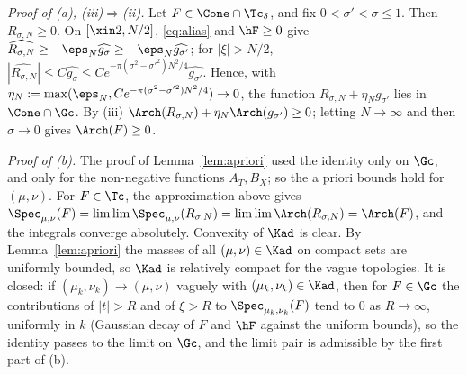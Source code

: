 \emph{Proof of \textup{(a)}, \textup{(iii)}$\Rightarrow$\textup{(ii)}.} Let $F\in\Cone\cap\Tc_\delta$, and fix $0<\sigma'<\sigma\le1$. Then
$R_{\sigma,N}\ge0$. On $[\xin2,N/2]$, \eqref{eq:alias} and $\hF\ge0$ give $\widehat{R_{\sigma,N}}\ge-\eps_N\widehat{g_\sigma}\ge-\eps_N\widehat{g_{\sigma'}}$; for
$|\xi|>N/2$, $|\widehat{R_{\sigma,N}}|\le C\widehat{g_\sigma}\le Ce^{-\pi(\sigma^2-\sigma'^2)N^2/4}\widehat{g_{\sigma'}}$. Hence, with
$\eta_N:=\max(\eps_N,Ce^{-\pi(\sigma^2-\sigma'^2)N^2/4})\to0$, the function $R_{\sigma,N}+\eta_Ng_{\sigma'}$ lies in $\Cone\cap\Gc$. By (iii)
$\Arch(R_{\sigma,N})+\eta_N\Arch(g_{\sigma'})\ge0$; letting $N\to\infty$ and then $\sigma\to0$ gives $\Arch(F)\ge0$.

\emph{Proof of \textup{(b)}.} The proof of Lemma~\ref{lem:apriori} used the identity only on $\Gc$, and only for the non-negative
functions $A_T,B_X$; so the a priori bounds hold for $(\mu,\nu)$. For $F\in\Tc$, the approximation above gives
$\Spec_{\mu,\nu}(F)=\lim\lim\Spec_{\mu,\nu}(R_{\sigma,N})=\lim\lim\Arch(R_{\sigma,N})=\Arch(F)$, and the integrals converge absolutely. Convexity of
$\Kad$ is clear. By Lemma~\ref{lem:apriori} the masses of all $(\mu,\nu)\in\Kad$ on compact sets are uniformly bounded, so $\Kad$ is relatively
compact for the vague topologies. It is closed: if $(\mu_k,\nu_k)\to(\mu,\nu)$ vaguely with $(\mu_k,\nu_k)\in\Kad$, then for $F\in\Gc$ the
contributions of $|t|>R$ and of $\xi>R$ to $\Spec_{\mu_k,\nu_k}(F)$ tend to $0$ as $R\to\infty$, uniformly in $k$ (Gaussian decay of $F$ and
$\hF$ against the uniform bounds), so the identity passes to the limit on $\Gc$, and the limit pair is admissible by the first part of (b).

